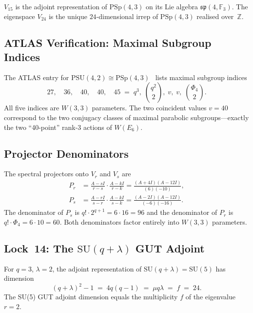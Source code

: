 \begin{corollary}
$V_{15}$ is the adjoint representation of $\mathrm{PSp}(4,3)$ on its Lie algebra
$\mathfrak{sp}(4, \mathbb{F}_3)$.  The eigenspace $V_{24}$ is the unique
$24$-dimensional irrep of $\mathrm{PSp}(4,3)$ realised over~$\mathbb{Z}$.
\end{corollary}

\subsection{ATLAS Verification: Maximal Subgroup Indices}

The ATLAS entry for $\mathrm{PSU}(4,2) \cong \mathrm{PSp}(4,3)$~\cite{ATLAS_online}
lists maximal subgroup indices
\[
  27,\quad 36,\quad 40,\quad 40,\quad 45
  \;=\; q^3,\; \binom{q^2}{2},\; v,\; v,\; \binom{\Phi_4}{2}.
\]
All five indices are $W(3,3)$ parameters.  The two coincident values $v = 40$ correspond to
the two conjugacy classes of maximal parabolic subgroups---exactly the two ``40-point''
rank-$3$ actions of $W(E_6)$.

\subsection{Projector Denominators}

The spectral projectors onto $V_r$ and $V_s$ are
\[
  \begin{aligned}
  P_r &= \frac{A - sI}{r - s} \cdot \frac{A - kI}{r - k}
    = \frac{(A+4I)(A-12I)}{(6)(-10)},\\
  P_s &= \frac{A - rI}{s - r} \cdot \frac{A - kI}{s - k}
    = \frac{(A-2I)(A-12I)}{(-6)(-16)}.
  \end{aligned}
\]
The denominator of $P_s$ is $q! \cdot 2^{q+1} = 6 \cdot 16 = 96$ and the
denominator of $P_r$ is $q! \cdot \Phi_4 = 6 \cdot 10 = 60$.
Both denominators factor entirely into $W(3,3)$ parameters.

\subsection{Lock~14: The $\mathrm{SU}(q+\lambda)$ GUT Adjoint}

\begin{theorem}[Lock~14]
For $q = 3$, $\lambda = 2$, the adjoint representation of $\mathrm{SU}(q+\lambda) = \mathrm{SU}(5)$
has dimension
\[
  (q+\lambda)^2 - 1 \;=\; 4q(q-1) \;=\; \mu q \lambda \;=\; f \;=\; 24.
\]
The SU(5) GUT adjoint dimension equals the multiplicity $f$ of the eigenvalue $r = 2$.
\end{theorem}

